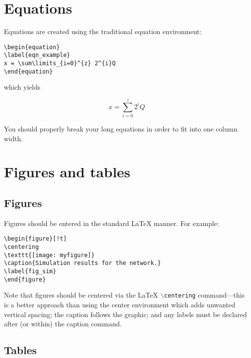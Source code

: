 \documentclass[10pt, conference,a4paper]{ITKproc}
\begin{document}
\section{Equations}
Equations are created using the traditional equation environment:
\begin{small}
\begin{verbatim}
\begin{equation}
\label{eqn_example}
x = \sum\limits_{i=0}^{z} 2^{i}Q
\end{equation}
\end{verbatim}
\end{small}

which yields

\begin{equation}
\label{eqn_example}
x = \sum\limits_{i=0}^{z} 2^{i}Q
\end{equation}

You should properly break your long equations in order to fit into one column width.

\section{Figures and tables}

\subsection{Figures}
Figures should be entered in the standard {\LaTeX} manner. For example:

\begin{small}
\begin{verbatim}
\begin{figure}[!t]
\centering
\texttt{[image: myfigure]}
\caption{Simulation results for the network.}
\label{fig_sim}
\end{figure}
\end{verbatim}
\end{small}

Note that figures should be centered via the {\LaTeX} \texttt{$\backslash$centering} command—this is a better approach than using the center environment which adds unwanted vertical spacing; the caption follows the graphic; and any labels must be
declared after (or within) the caption command.

\subsection{Tables}
\end{document}
